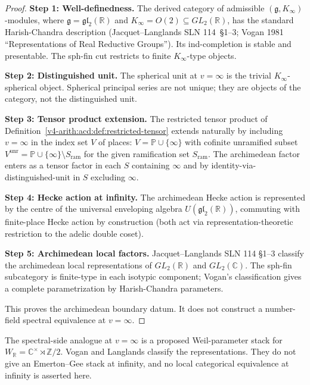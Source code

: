 \begin{proof}
\textbf{Step 1: Well-definedness.} The derived category of admissible
\((\mathfrak{g}, K_{\infty})\)-modules, where
\(\mathfrak{g}=\mathfrak{gl}_{2}(\mathbb{R})\) and
\(K_{\infty}=O(2)\subseteq GL_{2}(\mathbb{R})\), has the standard
Harish-Chandra description (Jacquet--Langlands SLN 114~\S1--3;
Vogan 1981 ``Representations of Real Reductive Groups''). Its
ind-completion is stable and presentable. The sph-fin cut restricts to
finite \(K_{\infty}\)-type objects.

\textbf{Step 2: Distinguished unit.} The spherical unit at
\(v=\infty\) is the trivial \(K_{\infty}\)-spherical object.  Spherical
principal series are not unique; they are objects of the category, not
the distinguished unit.

\textbf{Step 3: Tensor product extension.} The restricted tensor
product of Definition~\ref{v4-arith:acd:def:restricted-tensor} extends
naturally by including \(v=\infty\) in the index set \(V\) of places:
\(V=\mathbb{P}\cup\{\infty\}\) with cofinite unramified subset
\(V^{\mathrm{unr}}=\mathbb{P}\cup\{\infty\}\setminus S_{\mathrm{ram}}\)
for the given ramification set \(S_{\mathrm{ram}}\). The archimedean
factor enters as a tensor factor in each \(S\) containing \(\infty\) and
by identity-via-distinguished-unit in \(S\) excluding \(\infty\).

\textbf{Step 4: Hecke action at infinity.} The archimedean Hecke
action is represented by the centre of the universal enveloping algebra
\(U(\mathfrak{gl}_{2}(\mathbb{R}))\), commuting with finite-place
Hecke action by construction (both act via representation-theoretic
restriction to the adelic double coset).

\textbf{Step 5: Archimedean local factors.} Jacquet--Langlands SLN
114 \S1--3 classify the archimedean local representations of
\(GL_{2}(\mathbb{R})\) and \(GL_{2}(\mathbb{C})\). The sph-fin
subcategory is finite-type in each isotypic component; Vogan's
classification gives a complete parametrization by
Harish-Chandra parameters.

This proves the archimedean boundary datum. It does not construct a
number-field spectral equivalence at \(v=\infty\).
\end{proof}

\begin{remark}
\label{v4-arith:acd:rem:archimedean-spectral}
The spectral-side analogue at \(v=\infty\) is
a proposed Weil-parameter stack for
\(W_{\mathbb{R}}=\mathbb{C}^{\times}\rtimes\mathbb{Z}/2\).  Vogan and
Langlands classify the representations.  They do not give an
Emerton--Gee stack at infinity, and no local categorical equivalence at
infinity is asserted here.
\end{remark}

